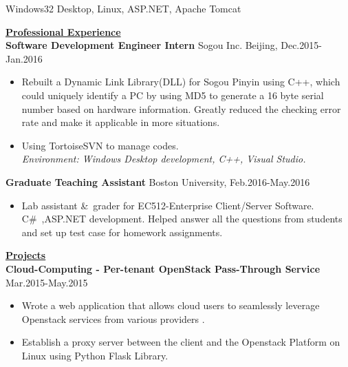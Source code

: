 \documentclass{resume} %
\begin{document}
\begin{spacing}{1}
\begin{center}
\hspace{-6cm}{\bf Environment:} \hspace{1.55cm} {Windows32 Desktop, Linux, ASP.NET, Apache Tomcat } \\

\vspace{4mm}

\uline{{\bf{\LARGE Professional Experience}}\hfill{\hspace{10cm}{}}} \\
\vspace{1mm}
{\bf Software Development Engineer Intern} \hfill {\small Sogou Inc. Beijing, Dec.2015-Jan.2016} \\
\vspace{-0mm}
\begin{itemize}
\item{Rebuilt a Dynamic Link Library(DLL) for Sogou Pinyin using C++, which could uniquely identify a PC by using MD5 to generate a 16 byte serial number based on hardware information. Greatly reduced the checking error rate and make it applicable in more situations. }\\
\item{Using TortoiseSVN to manage codes.}\\
    \hspace{-9mm}\textit{Environment: Windows Desktop development, C++, Visual Studio.}
\end{itemize}
{\bf Graduate Teaching Assistant } \hfill {\small Boston University,  Feb.2016-May.2016} \\
\vspace{-0mm}
\begin{itemize}
\item{ Lab assistant \&\ grader for EC512-Enterprise Client/Server Software. C\#\ ,ASP.NET development. Helped answer all the questions from students and set up test case for homework assignments.}\\

\end{itemize}
\vspace{-1mm}
\vspace{2.5mm}
\uline{{\bf{\LARGE Projects}}\hfill{\hspace{10cm}{}}} \\
\vspace{1mm}	
{\bf Cloud-Computing - Per-tenant OpenStack Pass-Through Service } \hfill {\small Mar.2015-May.2015} \\
\vspace{-0mm}
\begin{itemize}
\item{Wrote a web application that allows cloud users to seamlessly leverage Openstack services from various providers
.} \\
\item{Establish a proxy server between the client and the Openstack Platform on Linux using Python Flask Library.} \\


\end{itemize}
\end{center}
\end{spacing}
\end{document}
